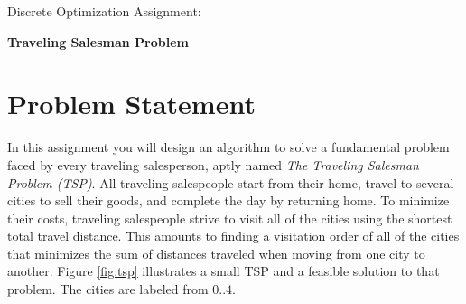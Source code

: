 \documentclass[11pt]{article}
\begin{document}
\huge
\noindent
{Discrete Optimization Assignment:}
\vspace{0.25cm}

\noindent
{\bf Traveling Salesman Problem}
\normalsize


\section{Problem Statement}

In this assignment you will design an algorithm to solve a fundamental problem faced by every traveling salesperson, aptly named {\em The Traveling Salesman Problem (TSP)}.  All traveling salespeople start from their home, travel to several cities to sell their goods, and complete the day by returning home.  To minimize their costs, traveling salespeople strive to visit all of the cities using the shortest total travel distance.  This amounts to finding a visitation order of all of the cities that  minimizes the sum of distances traveled when moving from one city to another.  Figure \ref{fig:tsp} illustrates a small TSP and a feasible solution to that problem.  The cities are labeled from $0..4$.
\end{document}
